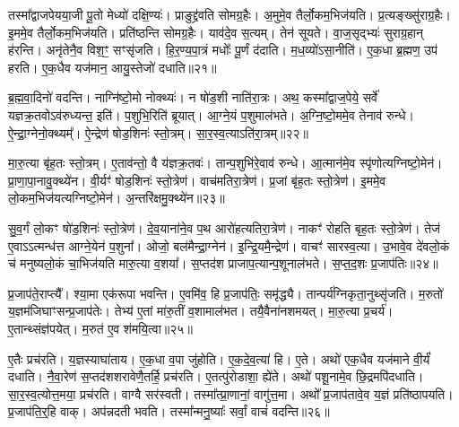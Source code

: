 तस्मा᳚द्वाजपेयया॒जी पू॒तो मेध्यो॑ दक्षि॒ण्यः॑।
प्राङुद्द्र॑वति सोम\-ग्र॒हैः।
अ॒मुमे॒व तैर्लो॒क\-म॒भिज॑यति।
प्र॒त्यङ्ख्सु॑राग्र॒हैः।
इ॒ममे॒व तैर्लो॒कम॒भिज॑यति।
प्रति॑\-ष्ठन्ति सोमग्र॒हैः।
याव॑दे॒व स॒त्यम्।
तेन॑ सूयते।
वा॒ज॒सृद्भ्यः॑ सुराग्र॒हान् ह॑रन्ति।
अनृ॑तेनै॒व विश॒ꣳ॒ सꣳ\-सृ॑जति।
हि॒र॒ण्य॒पा॒त्रं मधोः᳚ पू॒र्णं द॑दाति।
म॒ध॒व्यो॑\-ऽसा॒नीति॑।
ए॒क॒धा ब्र॒ह्मण॒ उप॑ हरति।
ए॒क॒धैव यज॑मान॒ आयु॒स्तेजो॑ दधाति॥२१॥

ब्र॒ह्म॒वा॒दिनो॑ वदन्ति।
नाग्नि॑ष्टो॒मो नोक्थ्यः॑।
न षो॑ड॒शी नाति॑\-रा॒त्रः।
अथ॒ कस्मा᳚द्वाज॒पेये॒ सर्वे॑ यज्ञक्र॒तवो\-ऽव॑रुध्यन्त॒ इति॑।
प॒शुभि॒\-रिति॑ ब्रूयात्।
आ॒ग्ने॒यं प॒शुमाल॑भते।
अ॒ग्नि॒ष्टो॒ममे॒व तेनाव॑ रुन्धे।
ऐ॒न्द्रा॒ग्नेनो॒क्थ्यम्᳚।
ऐ॒न्द्रेण॑ षोड॒शिनः॑ स्तो॒त्रम्।
सा॒र॒स्व॒त्या\-ऽति॑रा॒त्रम्॥२२॥

मा॒रु॒त्या बृ॑ह॒तः स्तो॒त्रम्।
ए॒ताव॑न्तो॒ वै य॑ज्ञक्र॒तवः॑।
तान्प॒शुभि॑रे॒वाव॑ रुन्धे।
आ॒त्मान॑मे॒व स्पृ॑णोत्यग्निष्टो॒मेन॑।
प्रा॒णा॒पा॒नावु॒क्थ्ये॑न।
वी॒र्यꣳ॑ षोड॒शिनः॑ स्तो॒त्रेण॑।
वाच॑मतिरा॒त्रेण॑।
प्र॒जां बृ॑ह॒तः स्तो॒त्रेण॑।
इ॒ममे॒व लो॒कम॒भिज॑यत्यग्निष्टो॒मेन॑।
अ॒न्तरि॑क्षमु॒क्थ्ये॑न॥२३॥

सु॒व॒र्गं लो॒कꣳ षो॑ड॒शिनः॑ स्तो॒त्रेण॑।
दे॒व॒याना॑ने॒व प॒थ आरो॑हत्यतिरा॒त्रेण॑।
नाकꣳ॑ रोहति बृह॒तः स्तो॒त्रेण॑।
तेज॑ ए॒वाऽऽत्मन्ध॑त्त आग्ने॒येन॑ प॒शुना᳚।
ओजो॒ बल॑मैन्द्रा॒ग्नेन॑।
इ॒न्द्रि॒यमै॒न्द्रेण॑।
वाचꣳ॑ सारस्व॒त्या।
उ॒भावे॒व दे॑वलो॒कं च॑ मनुष्यलो॒कं चा॒भिज॑यति मारु॒त्या व॒शया᳚।
स॒प्तद॑श प्राजाप॒त्यान्प॒शूनाल॑भते।
स॒प्त॒द॒शः प्र॒जा\-प॑तिः॥२४॥

प्र॒जा\-प॑ते॒राप्त्यै᳚।
श्या॒मा एक॑रूपा भवन्ति।
ए॒वमि॑व॒ हि प्र॒जा\-प॑तिः॒ समृ॑द्ध्यै।
तान्पर्य॑ग्निकृता॒नुथ्सृ॑जति।
म॒रुतो॑ य॒ज्ञ\-म॑जिघाꣳ\-सन्प्र॒जा\-प॑तेः।
तेभ्य॑ ए॒तां मा॑रु॒तीं व॒शामाल॑भत।
तयै॒वैना॑नशमयत्।
मा॒रु॒त्या प्र॒चर्य॑।
ए॒तान्थ्संज्ञ॑पयेत्।
म॒रुत॑ ए॒व श॑मयि॒त्वा॥२५॥

ए॒तैः प्रच॑रति।
य॒ज्ञस्याघा॑ताय।
ए॒क॒धा व॒पा जु॑होति।
ए॒क॒दे॒व॒त्या॑ हि।
ए॒ते।
अथो॑ एक॒धैव यज॑माने वी॒र्यं॑ दधाति।
नै॒वा॒रेण॑ स॒प्तद॑शशरावेणै॒तर्\mbox{}हि॒ प्रच॑रति।
ए॒तत्पु॑रोडाशा॒ ह्ये॑ते।
अथो॑ पशू॒नामे॒व छि॒द्रमपि॑दधाति।
सा॒र॒स्व॒त्योत्त॒मया॒ प्रच॑रति।
वाग्वै सर॑स्वती।
तस्मा᳚त्प्रा॒णानां॒ वागु॑त्त॒मा।
अथो᳚ प्र॒जा\-प॑तावे॒व य॒ज्ञं प्रति॑\-ष्ठापयति।
प्र॒जा\-प॑ति॒र्‌॒\mbox{}हि वाक्।
अप॑न्नदती भवति।
तस्मा᳚न्मनु॒ष्याः᳚ सर्वां॒ वाचं॑ वदन्ति॥२६॥\anuvakamend[अ॒ति॒रा॒त्रम॒न्तरि॑क्षमु॒क्थ्ये॑न प्र॒जा\-प॑तिः शमयि॒त्वोत्त॒मया॒ प्रच॑रति॒ षट् च॑]

